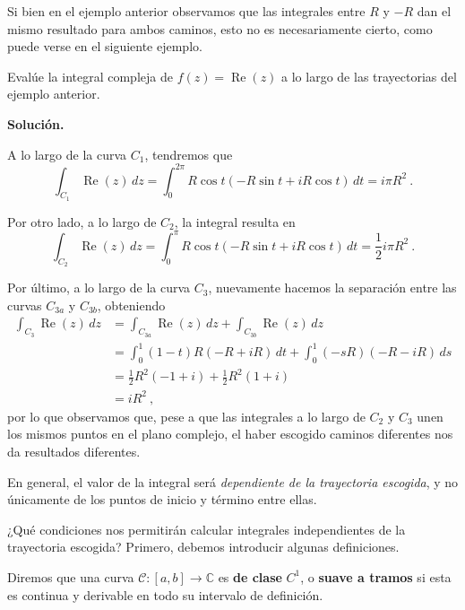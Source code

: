 Si bien en el ejemplo anterior observamos que las integrales entre $R$ y $-R$ dan el mismo resultado para ambos caminos, esto no es necesariamente cierto, como puede verse en el siguiente ejemplo.

\begin{ejemplo}
    Evalúe la integral compleja de $f(z) = \operatorname{Re}(z)$ a lo largo de las trayectorias del ejemplo anterior.

    \noindent \textbf{Solución.}

    A lo largo de la curva $C_1$, tendremos que 
    \begin{equation*}
        \int_{C_1} \operatorname{Re}(z) \, dz = \int_0^{2\pi} R \cos t (-R \sin t + iR \cos t) \, dt = i\pi R^2 \ .
    \end{equation*}

    Por otro lado, a lo largo de $C_2$, la integral resulta en 
    \begin{equation*}
        \int_{C_2} \operatorname{Re}(z) \, dz = \int_0^{\pi} R \cos t (-R \sin t + iR \cos t) \, dt = \frac{1}{2} i\pi R^2 \ .
    \end{equation*}

    Por último, a lo largo de la curva $C_3$, nuevamente hacemos la separación entre las curvas $C_{3a}$ y $C_{3b}$, obteniendo 
    \begin{align*}
        \int_{C_3} \operatorname{Re}(z) \, dz & = \int_{C_{3a}} \operatorname{Re}(z) \, dz + \int_{C_{3b}} \operatorname{Re}(z) \, dz \\
        & = \int_0^1 (1-t) R(-R+iR) \, dt + \int_0^1 (-sR)(-R - iR) \, ds \\
        & = \frac{1}{2} R^2(-1+i) + \frac{1}{2} R^2 (1+i) \\
        & = iR^2 \ ,
    \end{align*}
    por lo que observamos que, pese a que las integrales a lo largo de $C_2$ y $C_3$ unen los mismos puntos en el plano complejo, el haber escogido caminos diferentes nos da resultados diferentes.
\end{ejemplo}

En general, el valor de la integral será \emph{dependiente de la trayectoria escogida}, y no únicamente de los puntos de inicio y término entre ellas.

¿Qué condiciones nos permitirán calcular integrales independientes de la trayectoria escogida? Primero, debemos introducir algunas definiciones.

\begin{defi}
    Diremos que una curva $\mathcal{C}: [a,b] \to \mathbb{C}$ es \textbf{de clase} $C^1$, o \textbf{suave a tramos} si esta es continua y derivable en todo su intervalo de definición.
\end{defi}


